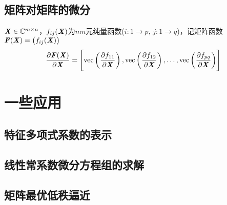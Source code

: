 \subsection{矩阵对矩阵的微分}
\label{sub:矩阵对矩阵的微分}

\begin{definition}[矩阵$\MF(\MX)$对$\MX$的微分]
    $\boldsymbol{\mathit{X}} \in \mathbb{C}^{m \times n}$，$f_{ij}(\boldsymbol{\mathit{X}})$为$mn$元纯量函数($i\colon 1 \to p,\, j\colon 1 \to q$)，记矩阵函数$\boldsymbol{\mathit{F}}(\boldsymbol{\mathit{X}}) = \left( f_{ij}(\boldsymbol{\mathit{X}}) \right)$
    $$
    \frac{\partial \boldsymbol{\mathit{F}}(\boldsymbol{\mathit{X}})}{\partial \boldsymbol{\mathit{X}}} = \left[ \mathrm{vec}\left(\frac{\partial f_{11}}{\partial \boldsymbol{\mathit{X}}}  \right), \mathrm{vec}\left(\frac{\partial f_{12}}{\partial \boldsymbol{\mathit{X}}}  \right), \ldots, \mathrm{vec}\left(\frac{\partial f_{pq}}{\partial \boldsymbol{\mathit{X}}}  \right)  \right]
    $$
\end{definition}

\section{一些应用}
\label{sec:一些应用}


\subsection{特征多项式系数的表示}
\label{sub:特征多项式系数的表示}

\subsection{线性常系数微分方程组的求解}
\label{sub:线性常系数微分方程组的求解}

\subsection{矩阵最优低秩逼近}
\label{sub:矩阵最优低秩逼近}

